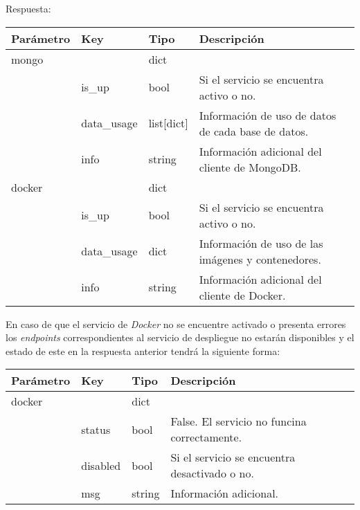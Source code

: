 \pagebreak
Respuesta:
\begin{table}[h!]
	\centering
	\begin{adjustbox}{max width=\textwidth}
	\begin{tabularx}{\linewidth}{|l|l|l|L|}
		\hline
		Parámetro & Key & Tipo & Descripción \\ \hline
		mongo &  & dict &  \\ \hline
		& is\_up & bool & Si el servicio se encuentra activo o no. \\ \hline
		& data\_usage & list[dict] & Información de uso de datos de cada base de datos. \\ \hline
		& info & string & Información adicional del cliente de MongoDB. \\ \hline
		docker &  & dict &  \\ \hline
		& is\_up & bool & Si el servicio se encuentra activo o no. \\ \hline
		& data\_usage & dict & Información de uso de las imágenes y contenedores. \\ \hline
		& info & string & Información adicional del cliente de Docker. \\ \hline
	\end{tabularx}
	\end{adjustbox}
\end{table}


En caso de que el servicio de \textit{Docker} no se encuentre activado o presenta errores los \textit{endpoints} correspondientes al servicio de despliegue no estarán disponibles y el estado de este en la respuesta anterior tendrá la siguiente forma:

\begin{table}[h!]
	\centering
	
	\begin{adjustbox}{max width=\textwidth}
	\begin{tabular}{|l|l|l|l|}
		\hline
		Parámetro & Key & Tipo & Descripción \\ \hline
		docker &  & dict &  \\ \hline
		& status & bool & False. El servicio no funcina correctamente. \\ \hline
		& disabled & bool & Si el servicio se encuentra desactivado o no. \\ \hline
		& msg & string & Información adicional. \\ \hline
	\end{tabular}
	\end{adjustbox}
\end{table}






